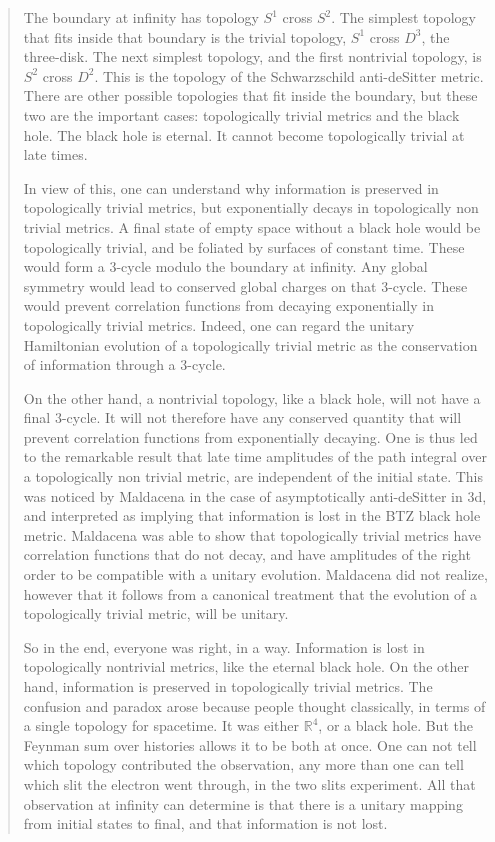 \documentclass{article}
\begin{document}
\begin{quote}
The boundary at infinity has topology \(S^1\) cross \(S^2\). The
simplest topology that fits inside that boundary is the trivial
topology, \(S^1\) cross \(D^3\), the three-disk. The next simplest
topology, and the first nontrivial topology, is \(S^2\) cross \(D^2\).
This is the topology of the Schwarzschild anti-deSitter metric. There
are other possible topologies that fit inside the boundary, but these
two are the important cases: topologically trivial metrics and the black
hole. The black hole is eternal. It cannot become topologically trivial
at late times.

In view of this, one can understand why information is preserved in
topologically trivial metrics, but exponentially decays in topologically
non trivial metrics. A final state of empty space without a black hole
would be topologically trivial, and be foliated by surfaces of constant
time. These would form a \(3\)-cycle modulo the boundary at infinity.
Any global symmetry would lead to conserved global charges on that
\(3\)-cycle. These would prevent correlation functions from decaying
exponentially in topologically trivial metrics. Indeed, one can regard
the unitary Hamiltonian evolution of a topologically trivial metric as
the conservation of information through a \(3\)-cycle.

On the other hand, a nontrivial topology, like a black hole, will not
have a final \(3\)-cycle. It will not therefore have any conserved
quantity that will prevent correlation functions from exponentially
decaying. One is thus led to the remarkable result that late time
amplitudes of the path integral over a topologically non trivial metric,
are independent of the initial state. This was noticed by Maldacena in
the case of asymptotically anti-deSitter in 3d, and interpreted as
implying that information is lost in the BTZ black hole metric.
Maldacena was able to show that topologically trivial metrics have
correlation functions that do not decay, and have amplitudes of the
right order to be compatible with a unitary evolution. Maldacena did not
realize, however that it follows from a canonical treatment that the
evolution of a topologically trivial metric, will be unitary.

So in the end, everyone was right, in a way. Information is lost in
topologically nontrivial metrics, like the eternal black hole. On the
other hand, information is preserved in topologically trivial metrics.
The confusion and paradox arose because people thought classically, in
terms of a single topology for spacetime. It was either
\(\mathbb{R}^4\), or a black hole. But the Feynman sum over histories
allows it to be both at once. One can not tell which topology
contributed the observation, any more than one can tell which slit the
electron went through, in the two slits experiment. All that observation
at infinity can determine is that there is a unitary mapping from
initial states to final, and that information is not lost.


\end{quote}
\end{document}
